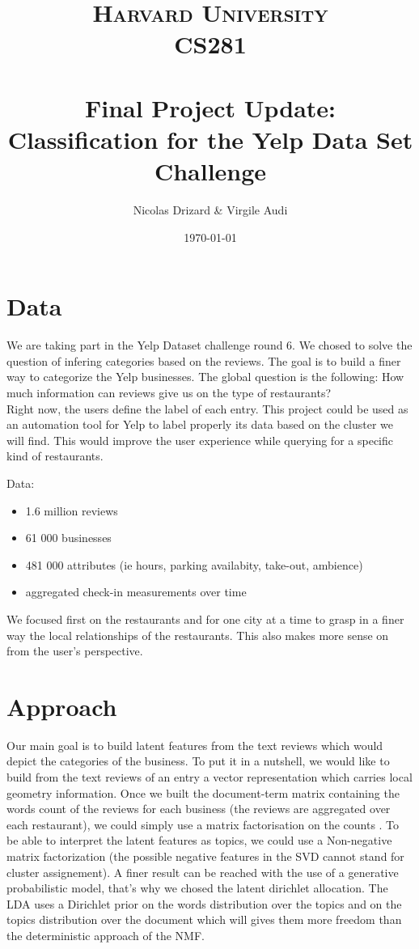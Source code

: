 \documentclass[paper=a4, fontsize=11pt]{scrartcl} %
\title{	
\normalfont \normalsize 
\textsc{Harvard University} \\[25pt]
\textsc{CS281} \\[25pt]
\horrule{0.5pt} \\[0.1cm] 
\huge Final Project Update: \\
\huge Classification for the Yelp Data Set Challenge
\horrule{2pt} \\[0.5cm]
}
\author{Nicolas Drizard \& Virgile Audi}
\date{\normalsize\today}
\numberwithin{equation}{section}
\numberwithin{figure}{section}
\numberwithin{table}{section}
\begin{document}
\maketitle

\section{Data}

We are taking part in the Yelp Dataset challenge round 6. We chosed to solve the question of infering categories based on the reviews. The goal is to build a finer way to categorize the Yelp businesses. The global question is the following: How much information can reviews give us on the type of restaurants?\\

Right now, the users define the label of each entry. This project could be used as an automation tool for Yelp to label properly its data based on the cluster we will find. This would improve the user experience while querying for a specific kind of restaurants.

Data:
\begin{itemize}
		\item 1.6 million reviews
		\item 61 000 businesses
		\item 481 000 attributes (ie hours, parking availabity, take-out, ambience)
		\item aggregated check-in measurements over time
\end{itemize}

We focused first on the restaurants and for one city at a time to grasp in a finer way the local relationships of the restaurants. This also makes more sense on from the user's perspective.\\

\section{Approach}

Our main goal is to build latent features from the text reviews which would depict the categories of the business. To put it in a nutshell, we would like to build from the text reviews of an entry a vector representation which carries local geometry information. Once we built the document-term matrix containing the words count of the reviews for each business (the reviews are aggregated over each restaurant), we could simply use a matrix factorisation on the counts . To be able to interpret the latent features as topics, we could use a Non-negative matrix factorization (the possible negative features in the SVD cannot stand for cluster assignement). A finer result can be reached with the use of a generative probabilistic model, that's why we chosed the latent dirichlet allocation. The LDA uses a Dirichlet prior on the words distribution over the topics and on the topics distribution over the document which will gives them more freedom than the deterministic approach of the NMF.\\
\end{document}
